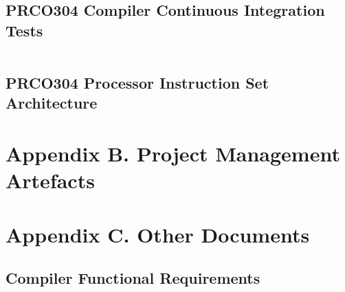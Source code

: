 \documentclass[11pt,a4paper]{report}
\newcommand{\scname}{PRCO304}
\begin{document}
\newpage
\subsection{\scname{} Compiler Continuous Integration Tests}
\label{appendix:travisci}
\inputminted{text}{compiler_ci.txt}

\newpage
\subsection{\scname{} Processor Instruction Set Architecture}


\newpage
\section{Appendix B. Project Management Artefacts}


\newpage



\newpage
\section{Appendix C. Other Documents}
\subsection{Compiler Functional Requirements}
\label{sect:compiler_func_req}
\end{document}
